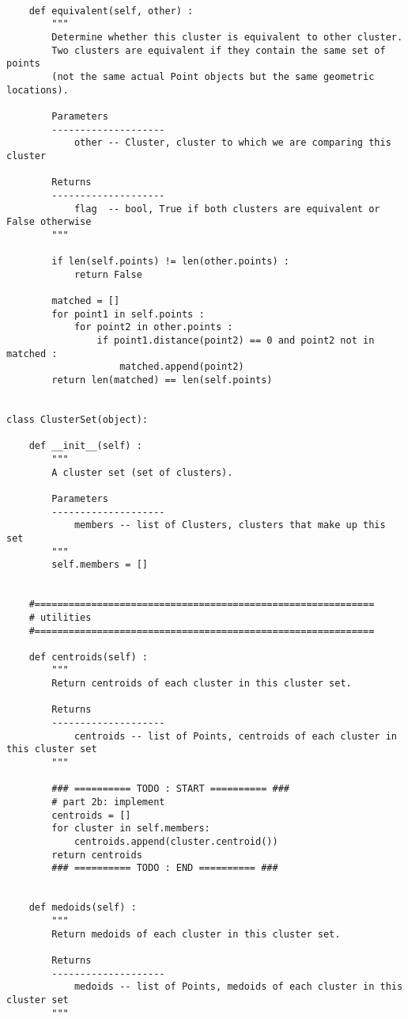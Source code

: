 \documentclass[11pt]{article}
\begin{document}
\begin{verbatim}
    
    def equivalent(self, other) :
        """
        Determine whether this cluster is equivalent to other cluster.
        Two clusters are equivalent if they contain the same set of points
        (not the same actual Point objects but the same geometric locations).
        
        Parameters
        --------------------
            other -- Cluster, cluster to which we are comparing this cluster
        
        Returns
        --------------------
            flag  -- bool, True if both clusters are equivalent or False otherwise
        """
        
        if len(self.points) != len(other.points) :
            return False
        
        matched = []
        for point1 in self.points :
            for point2 in other.points :
                if point1.distance(point2) == 0 and point2 not in matched :
                    matched.append(point2)
        return len(matched) == len(self.points)


class ClusterSet(object):

    def __init__(self) :
        """
        A cluster set (set of clusters).
        
        Parameters
        --------------------
            members -- list of Clusters, clusters that make up this set
        """
        self.members = []
    
    
    #============================================================
    # utilities
    #============================================================    
    
    def centroids(self) :
        """
        Return centroids of each cluster in this cluster set.
        
        Returns
        --------------------
            centroids -- list of Points, centroids of each cluster in this cluster set
        """
        
        ### ========== TODO : START ========== ###
        # part 2b: implement
        centroids = []
        for cluster in self.members:
            centroids.append(cluster.centroid())
        return centroids
        ### ========== TODO : END ========== ###
    
    
    def medoids(self) :
        """
        Return medoids of each cluster in this cluster set.
        
        Returns
        --------------------
            medoids -- list of Points, medoids of each cluster in this cluster set
        """
        

\end{verbatim}
\end{document}
